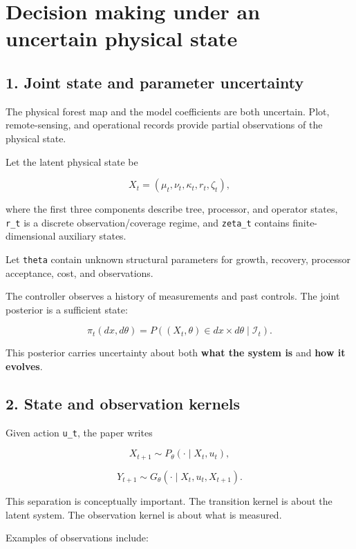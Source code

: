 \section{Decision making under an uncertain physical state}\label{decision-making-under-an-uncertain-physical-state}

\subsection{1. Joint state and parameter uncertainty}\label{joint-state-and-parameter-uncertainty}

The physical forest map and the model coefficients are both uncertain. Plot,
remote-sensing, and operational records provide partial observations of the
physical state.

Let the latent physical state be

\[
X_t=(\mu_t,\nu_t,\kappa_t,r_t,\zeta_t),
\]

where the first three components describe tree, processor, and operator states,
\texttt{r\_t} is a discrete observation/coverage regime, and \texttt{zeta\_t} contains finite-
dimensional auxiliary states.

Let \texttt{theta} contain unknown structural parameters for growth, recovery,
processor acceptance, cost, and observations.

The controller observes a history of measurements and past controls. The joint
posterior is a sufficient state:

\[
\pi_t(dx,d\theta)
=P((X_t,\theta)\in dx\times d\theta\mid\mathcal I_t).
\]

This posterior carries uncertainty about both \textbf{what the system is} and \textbf{how
it evolves}.

\subsection{2. State and observation kernels}\label{state-and-observation-kernels}

Given action \texttt{u\_t}, the paper writes

\[
X_{t+1}\sim P_\theta(\cdot\mid X_t,u_t),
\]

\[
Y_{t+1}\sim G_\theta(\cdot\mid X_t,u_t,X_{t+1}).
\]

This separation is conceptually important. The transition kernel is about the
latent system. The observation kernel is about what is measured.

Examples of observations include:

